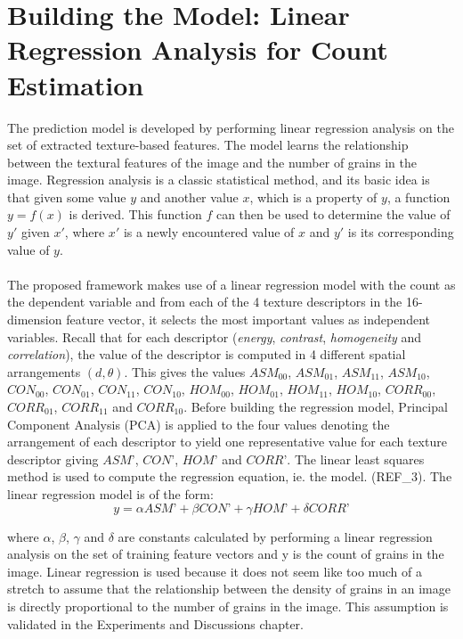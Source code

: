 \bigskip

\goodbreak
\section{Building the Model: Linear Regression Analysis for Count Estimation}
The prediction model is developed by performing linear regression analysis on the set of extracted texture-based features. The model learns the relationship between the textural features of the image and the number of grains in the image. Regression analysis is a classic statistical method, and its basic idea is that given some value $y$ and another value $x$, which is a property of $y$, a function $y = f(x)$ is derived. This function $f$ can then be used to determine the value of $y\prime$ given $x\prime$, where $x\prime$ is a newly encountered value of $x$ and $y\prime$ is its corresponding value of $y$.\\ \\
The proposed framework makes use of a linear regression model with the count as the dependent variable and from each of the 4 texture descriptors in the 16-dimension feature vector, it selects the most important values as independent variables. Recall that for each descriptor (\textit{energy}, \textit{contrast}, \textit{homogeneity} and \textit{correlation}), the value of the descriptor is computed in 4 different spatial arrangements $(d,\theta)$. This gives the values $ASM_{00}$, $ASM_{01}$, $ASM_{11}$, $ASM_{10}$, $CON_{00}$, $CON_{01}$, $CON_{11}$, $CON_{10}$, $HOM_{00}$, $HOM_{01}$, $HOM_{11}$, $HOM_{10}$, $CORR_{00}$, $CORR_{01}$, $CORR_{11}$ and $CORR_{10}$. Before building the regression model, Principal Component Analysis (PCA) is applied to the four values denoting the arrangement of each descriptor to yield one representative value for each texture descriptor giving $ASM\text{'}$, $CON\text{'}$, $HOM\text{'}$ and $CORR\text{'}$. The linear least squares method is used to compute the regression equation, ie. the model. (REF\_3). The linear regression model is of the form:
\begin{equation}
y = \alpha ASM\text{'} + \beta CON\text{'} + \gamma HOM\text{'} +\delta CORR\text{'}
\end{equation}

where $\alpha$, $\beta$, $\gamma$ and $\delta$ are constants calculated by performing a linear regression analysis on the set of training feature vectors and y is the count of grains in the image. Linear regression is used because it does not seem like too much of a stretch to assume that the relationship between the density of grains in an image is directly proportional to the number of grains in the image. This assumption is validated in the Experiments and Discussions chapter.
\bigskip

